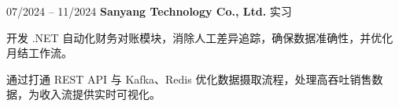 \begin{twocolentry}{07/2024 – 11/2024} \textbf{Sanyang Technology Co., Ltd.}
    \newline 实习 \end{twocolentry}
\begin{onecolentry}
\begin{highlights}
\item 开发 .NET 自动化财务对账模块，消除人工差异追踪，确保数据准确性，并优化月结工作流。
\item 通过打通 REST API 与 Kafka、Redis 优化数据摄取流程，处理高吞吐销售数据，为收入流提供实时可视化。
\end{highlights}
\end{onecolentry}
